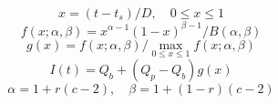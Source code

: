\documentclass{article}
\begin{document}
\begin{equation}x=(t-t_s)/D,\quad0\le x\le1\tag{16}\end{equation}
\begin{equation}f(x;\alpha,\beta)=x^{\alpha-1}(1-x)^{\beta-1}/B(\alpha,\beta)\tag{17}\end{equation}
\begin{equation}g(x)=f(x;\alpha,\beta)/\max_{0\le x\le1}f(x;\alpha,\beta)\tag{18}\end{equation}
\begin{equation}I(t)=Q_b+(Q_p-Q_b)g(x)\tag{19}\end{equation}
\begin{equation}\alpha=1+r(c-2),\quad\beta=1+(1-r)(c-2)\tag{20}\end{equation}
\end{document}
